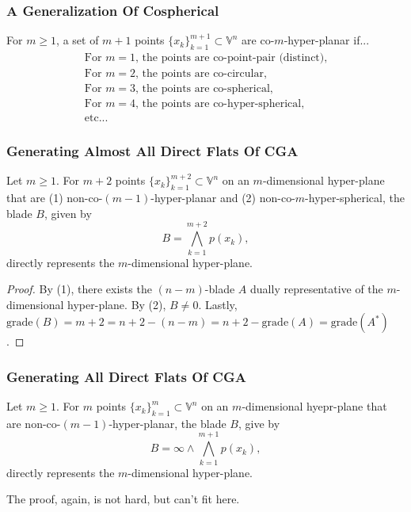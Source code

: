 \documentclass{beamer}
\newcommand{\V}{\mathbb{V}}
\newcommand{\nvai}{\infty}
\newcommand{\grade}{\mbox{grade}}
\begin{document}
\begin{frame}
\frametitle{A Generalization Of Cospherical}
\begin{definition}
For $m\geq 1$, a set of $m+1$ points $\{x_k\}_{k=1}^{m+1}\subset\V^n$ are \alert{co-$m$-hyper-planar} if...
\begin{equation*}
\begin{array}{l}
\mbox{For $m=1$, the points are co-point-pair (distinct),} \\
\mbox{For $m=2$, the points are co-circular,} \\
\mbox{For $m=3$, the points are co-spherical,} \\
\mbox{For $m=4$, the points are co-hyper-spherical,} \\
\mbox{etc...}
\end{array}
\end{equation*}
\end{definition}
\end{frame}

\begin{frame}
\frametitle{Generating \alert{Almost} All \alert{Direct Flats} Of CGA}
Let $m\geq 1$.
For $m+2$ points $\{x_k\}_{k=1}^{m+2}\subset\V^n$ on an $m$-dimensional hyper-plane that
are \alert{(1)} non-co-$(m-1)$-hyper-planar and \alert{(2)} non-co-$m$-hyper-spherical, the blade $B$,
given by
\begin{equation*}
B = \bigwedge_{k=1}^{m+2} p(x_k),
\end{equation*}
\alert{directly} represents the $m$-dimensional hyper-plane.
\begin{proof}
By \alert{(1)}, there exists the $(n-m)$-blade $A$ \alert{dually} representative of the
$m$-dimensional hyper-plane.  By \alert{(2)}, $B\neq 0$.  Lastly,
$\grade(B)=m+2=n+2-(n-m)=n+2-\grade(A)=\grade(A^*)$.
\end{proof}
\end{frame}

\begin{frame}
\frametitle{Generating All \alert{Direct Flats} Of CGA}
Let $m\geq 1$.  For $m$ points $\{x_k\}_{k=1}^m\subset\V^n$ on an $m$-dimensional
hyepr-plane that are non-co-$(m-1)$-hyper-planar, the blade $B$, give by
\begin{equation*}
B = \nvai\wedge\bigwedge_{k=1}^{m+1} p(x_k),
\end{equation*}
\alert{directly} represents the $m$-dimensional hyper-plane.

The proof, again, is not hard, but can't fit here.
\end{frame}
\end{document}
